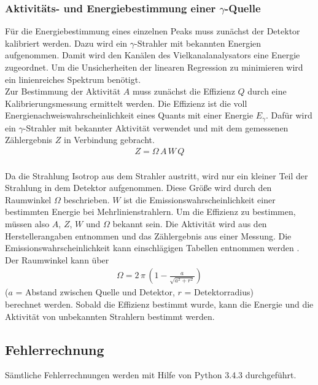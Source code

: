 \subsubsection{Aktivitäts- und Energiebestimmung einer \texorpdfstring{$\gamma$}{}-Quelle}
Für die Energiebestimmung eines einzelnen Peaks muss zunächst der Detektor kalibriert werden. Dazu wird ein $\gamma$-Strahler mit bekannten Energien aufgenommen. Damit wird den Kanälen des Vielkanalanalysators eine Energie zugeordnet. Um die Unsicherheiten der linearen Regression zu minimieren wird ein linienreiches Spektrum benötigt. \\
Zur Bestimmung der Aktivität $A$ muss zunächst die Effizienz $Q$ durch eine Kalibrierungsmessung ermittelt werden. Die Effizienz ist die voll Energienachweiswahrscheinlichkeit eines Quants mit einer Energie $E_\gamma$. Dafür wird ein $\gamma$-Strahler mit bekannter Aktivität verwendet und mit dem gemessenen Zählergebnis $Z$ in Verbindung gebracht.
\begin{align}
	Z = \Omega\,A\,W\,Q
	\label{eqn:Zählergebnis}
\end{align}
 \\
Da die Strahlung Isotrop aus dem Strahler austritt, wird nur ein kleiner Teil der Strahlung in dem Detektor aufgenommen. Diese Größe wird durch den Raumwinkel $\Omega$ beschrieben. $W$ ist die Emissionswahrscheinlichkeit einer bestimmten Energie bei Mehrlinienstrahlern. Um die Effizienz zu bestimmen, müssen also $A$, $Z$, $W$ und $\Omega$ bekannt sein. Die Aktivität wird aus den Herstellerangaben entnommen und das Zählergebnis aus einer Messung. Die Emissionswahrscheinlichkeit kann einschlägigen Tabellen entnommen werden \cite{V18}. Der Raumwinkel kann über
\begin{align}
	\Omega = 2\,\pi\,\left(1 - \frac{a}{\sqrt{a^2 + r^2}} \right)
	\label{eqn:Raumwinkel}
\end{align}
\hfil {\footnotesize($a$ = Abstand zwischen Quelle und Detektor, $r$ = Detektorradius)} \hfil \\
berechnet werden. Sobald die Effizienz bestimmt wurde, kann die Energie und die Aktivität von unbekannten Strahlern bestimmt werden.









\subsection{Fehlerrechnung}
Sämtliche Fehlerrechnungen werden mit Hilfe von Python 3.4.3 durchgeführt.
